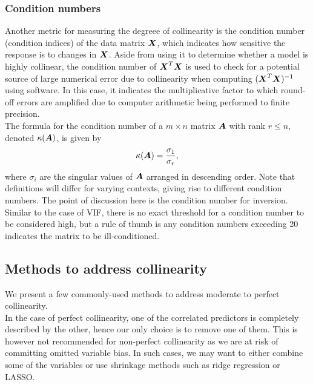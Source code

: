\documentclass[12pt]{article}
\begin{document}
	\subsubsection{Condition numbers}
	Another metric for measuring the degreee of collinearity is the condition number (condition indices) of the data matrix $\boldsymbol{X}$, which indicates how sensitive the response is to changes in $\boldsymbol{X}$. Aside from using it to determine whether a model is highly collinear, the condition number of $\boldsymbol{X}^T\boldsymbol{X}$ is used to check for a potential source of large numerical error due to collinearity when computing $(\boldsymbol{X}^T\boldsymbol{X})^{-1}$ using software. In this case, it indicates the multiplicative factor to which round-off errors are amplified due to computer arithmetic being performed to finite precision.\\
	
	The formula for the condition number of a $m\times n$ matrix $\boldsymbol{A}$ with rank $r\leq n$, denoted $\kappa(\boldsymbol{A})$, is given by
	$$\kappa(\boldsymbol{A})=\frac{\sigma_1}{\sigma_r},$$
	where $\sigma_i$ are the singular values of $\boldsymbol{A}$ arranged in descending order. Note that definitions will differ for varying contexts, giving rise to different condition numbers. The point of discussion here is the condition number for inversion.\\
	
	Similar to the case of VIF, there is no exact threshold for a condition number to be considered high, but a rule of thumb is any condition numbers exceeding 20 indicates the matrix to be ill-conditioned. 
	
	\subsection{Methods to address collinearity\label{sec:3.2}}
	
	We present a few commonly-used methods to address moderate to perfect collinearity. \\
	
	In the case of perfect collinearity, one of the correlated predictors is completely described by the other, hence our only choice is to remove one of them. This is however not recommended for non-perfect collinearity as we are at risk of committing omitted variable bias. In such cases, we may want to either combine some of the variables \cite{James2023} or use shrinkage methods such as ridge regression or LASSO.\\
	
\end{document}
